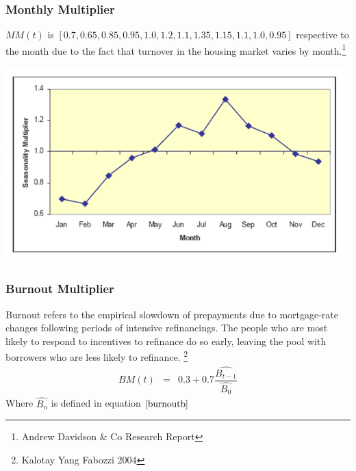 \documentclass[10pt,letterpaper]{article}
\begin{document}
\subsubsection{Monthly Multiplier}
$ MM(t) $ is $[0.7, 0.65, 0.85, 0.95, 1.0, 1.2, 1.1, 1.35, 1.15, 1.1, 1.0, 0.95]$ respective to the month due to the fact that turnover in the housing market varies by month.\footnote{Andrew Davidson \& Co Research Report}
\begin{center}
\includegraphics[scale=0.4]{monthlymultiplier.png}\\
\end{center}
\subsubsection{Burnout Multiplier}
Burnout refers to the empirical slowdown of prepayments due to mortgage-rate changes following periods of intensive refinancings. The people who are most likely to respond to incentives to refinance do so early, leaving the pool with borrowers who are less likely to refinance. \footnote{Kalotay Yang Fabozzi 2004} 
\begin{eqnarray}
BM(t) & = & 0.3 + 0.7 \dfrac{\hat{B_{t-1}}}{\hat{B_0}}
\end{eqnarray}
Where $\hat{B_n}$ is defined in equation $\ref{burnoutb}$
\end{document}
